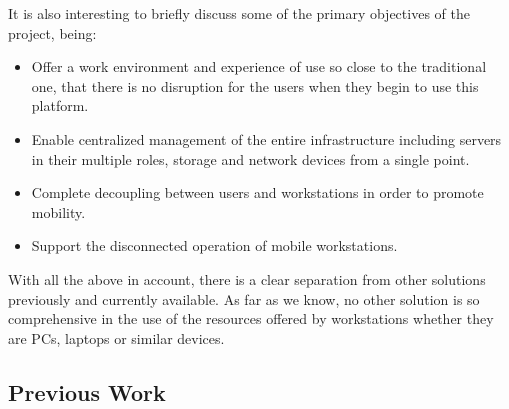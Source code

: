 

It is also interesting to briefly discuss some of the primary objectives of the project, being:
\begin{itemize}
	\item Offer a work environment and experience of use so close to the traditional one, that there is no disruption for the users when they begin to use this platform.
	\item Enable centralized management of the entire infrastructure including servers in their multiple roles, storage and network devices from a single point.
	\item Complete decoupling between users and workstations in order to promote mobility.
	\item Support the disconnected operation of mobile workstations.
\end{itemize}

With all the above in account, there is a clear separation from other solutions previously and currently available. As far as we know, no other solution is so comprehensive in the use of the resources offered by workstations whether they are PCs, laptops or similar devices.





\subsection{Previous Work} %
\label{sub:previous_work}

